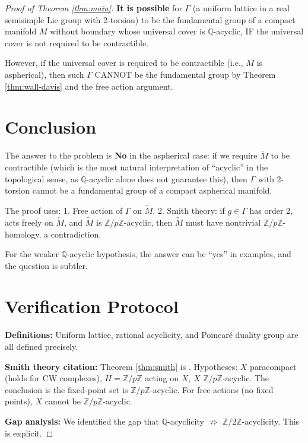 \documentclass[12pt]{article}
\begin{document}
\begin{proof}[Proof of Theorem \ref{thm:main}]
\textbf{It is possible} for $\Gamma$ (a uniform lattice in a real semisimple Lie group with 2-torsion) to be the fundamental group of a compact manifold $M$ without boundary whose universal cover is $\mathbb{Q}$-acyclic, IF the universal cover is not required to be contractible.

However, if the universal cover is required to be contractible (i.e., $M$ is aspherical), then such $\Gamma$ CANNOT be the fundamental group by Theorem \ref{thm:wall-davis} and the free action argument.

\section{Conclusion}

The answer to the problem is \textbf{No} in the aspherical case: if we require $\widetilde{M}$ to be contractible (which is the most natural interpretation of ``acyclic'' in the topological sense, as $\mathbb{Q}$-acyclic alone does not guarantee this), then $\Gamma$ with 2-torsion cannot be a fundamental group of a compact aspherical manifold.

The proof uses:
1. Free action of $\Gamma$ on $\widetilde{M}$.
2. Smith theory: if $g \in \Gamma$ has order 2, acts freely on $\widetilde{M}$, and $\widetilde{M}$ is $\mathbb{Z}/p\mathbb{Z}$-acyclic, then $\widetilde{M}$ must have nontrivial $\mathbb{Z}/p\mathbb{Z}$-homology, a contradiction.

For the weaker $\mathbb{Q}$-acyclic hypothesis, the answer can be ``yes'' in examples, and the question is subtler.

\section{Verification Protocol}

\textbf{Definitions:} Uniform lattice, rational acyclicity, and Poincar\'{e} duality group are all defined precisely.

\textbf{Smith theory citation:} Theorem \ref{thm:smith} is \cite[Chapter III]{Bredon1972}. Hypotheses: $X$ paracompact (holds for CW complexes), $H = \mathbb{Z}/p\mathbb{Z}$ acting on $X$, $X$ $\mathbb{Z}/p\mathbb{Z}$-acyclic. The conclusion is the fixed-point set is $\mathbb{Z}/p\mathbb{Z}$-acyclic. For free actions (no fixed points), $X$ cannot be $\mathbb{Z}/p\mathbb{Z}$-acyclic.

\textbf{Gap analysis:} We identified the gap that $\mathbb{Q}$-acyclicity $\not\Rightarrow$ $\mathbb{Z}/2\mathbb{Z}$-acyclicity. This is explicit.


\end{proof}
\end{document}
